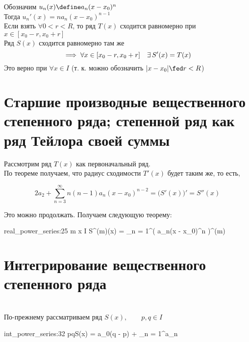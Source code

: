 \begin{implication}
	Обозначим $ u_n(x) \define a_n(x - x_0)^n $ \\
	Тогда $ u_n'(x) = na_n(x - x_0)^{n - 1} $ \\
	Если взять $ \forall 0 < r < R $, то ряд $ T(x) $ сходится равномерно при $ x \in [x_0 - r, x_0 + r] $ \\
	Ряд $ S(x) $ сходится равномерно там же
	$$ \implies \forall x \in [x_0 - r, x_0 + r] \quad \exists\, S'(x) = T(x) $$
	Это верно при $ \forall x \in I $ (т. к. можно обозначить $ |x - x_0| \fed r < R $)
\end{implication}

\section{Старшие производные вещественного степенного ряда; степенной ряд как ряд Тейлора своей суммы}

Рассмотрим ряд $ T(x) $ как первоначальный ряд. \\
По теореме получаем, что радиус сходимости $ T'(x) $ будет таким же, то есть,

\begin{implication}
	$$ 2a_2 + \sum_{n = 3}^\infty n(n - 1)a_n(x - x_0)^{n - 2} = \bigg( S'(x) \bigg)' = S''(x) $$
\end{implication}

Это можно продолжать. Получаем следующую теорему:

\begin{theorem}
	\begin{equ}{real_power_series:25}
		\forall m \quad \forall x \in I \quad \exist S^{(m)}(x) = \sum_{n = 1}^\infty \bigg( a_n(x - x_0)^n \bigg)^{(m)}
	\end{equ}
\end{theorem}

\section{Интегрирование вещественного степенного ряда}

\begin{theorem}
	\hfill \\
	По-прежнему рассматриваем ряд $ S(x), \qquad p, q \in I $ \nimp[(не обязательно $ p < q $)]
	\begin{equ}{int_power_series:32}
		\implies \dint pq{S(x)} = a_0(q - p) + \sum_{n = 1}^\infty a_n 
	\end{equ}
\end{theorem}

